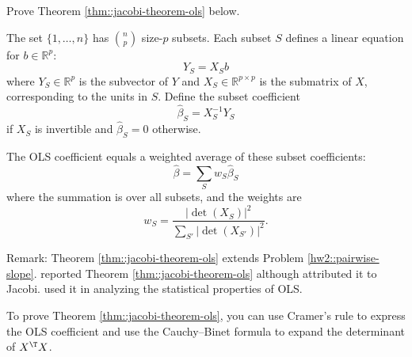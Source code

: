 Prove Theorem \ref{thm::jacobi-theorem-ols} below. 

\begin{theorem}
\label{thm::jacobi-theorem-ols}
The set $\{1 ,\ldots, n\}$ has $\binom{n}{p}$ size-$p$ subsets. Each subset $S$ defines a linear equation for $b\in \mathbb{R}^p$: 
$$
Y_S = X_S b   
$$
where $Y_S \in \mathbb{R}^{p}$ is the subvector of $Y$ and $X_S \in \mathbb{R}^{p\times p}$ is the submatrix of $X$, corresponding to the units in $S$. Define the subset coefficient 
$$
\hat{\beta}_S = X_S^{-1} Y_S
$$
if $X_S$ is invertible and  $\hat{\beta}_S =  0 $ otherwise. 

The OLS coefficient equals a weighted average of these subset coefficients: 
$$
\hat{\beta} = \sum_S   w_S  \hat{\beta}_S
$$
where the summation is over all subsets, and the weights are 
$$
w_S =  \frac{  |  \det(X_S) | ^2  }{  \sum_{S'}  |  \det(X_{S'}) | ^2 } . 
$$
\end{theorem}


 

Remark: 
Theorem \ref{thm::jacobi-theorem-ols} extends Problem \ref{hw2::pairwise-slope}. \citet{subrahmanyam1972property} reported Theorem \ref{thm::jacobi-theorem-ols} although
\citet{berman1988theorem} attributed it to Jacobi. 
\citet{wu1986jackknife} used it in analyzing the statistical properties of OLS. 

To prove Theorem \ref{thm::jacobi-theorem-ols}, you can use Cramer's rule to express the OLS coefficient and use the Cauchy--Binet formula to expand the determinant of $X^{\T} X$. 


